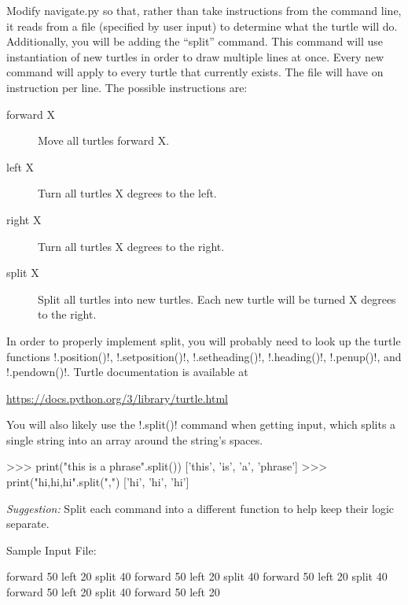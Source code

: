 \documentclass[11pt]{cselabheader}
\begin{document}
\begin{ex}[navigate3.py] Modify navigate.py so that, rather than take
  instructions from the command line, it reads from a file (specified by user
  input) to determine what the turtle will do. Additionally, you will be adding
  the ``split'' command. This command will use instantiation of new turtles in
  order to draw multiple lines at once. Every new command will apply to every
  turtle that currently exists. The file will have on instruction per line. The
  possible instructions are:

  \begin{description}
    \item[forward X] Move all turtles forward X.
    \item[left X] Turn all turtles X degrees to the left.
    \item[right X] Turn all turtles X degrees to the right.
    \item[split X] Split all turtles into new turtles. Each new turtle will be turned X degrees to the right.
  \end{description}

  In order to properly implement split, you will probably need to look up the
turtle functions \pythoninline!.position()!, \pythoninline!.setposition()!,
  \pythoninline!.setheading()!, \pythoninline!.heading()!, \pythoninline!.penup()!, and
  \pythoninline!.pendown()!. Turtle documentation is available at
  \begin{center}
    \url{https://docs.python.org/3/library/turtle.html}
  \end{center}

  You will also likely use the \pythoninline!.split()! command when getting
  input, which splits a single string into an array around the string's
  spaces.
  \begin{pyconcode}
>>> print("this is a phrase".split())
['this', 'is', 'a', 'phrase']
>>> print("hi,hi,hi".split(",")
['hi', 'hi', 'hi']
  \end{pyconcode}

  \emph{Suggestion:} Split each command into a different function to help keep their logic separate.

  Sample Input File:

  \begin{verbatimcode}
forward 50
left 20
split 40
forward 50
left 20
split 40
forward 50
left 20
split 40
forward 50
left 20
split 40
forward 50
left 20
  \end{verbatimcode}


\end{ex}
\end{document}
